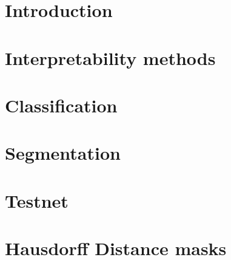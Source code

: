 \chapter{Introduction}


\chapter{Interpretability methods}








\chapter{Classification}







\chapter{Segmentation}










\chapter{Testnet}


\chapter{Hausdorff Distance masks}






%
%




%

